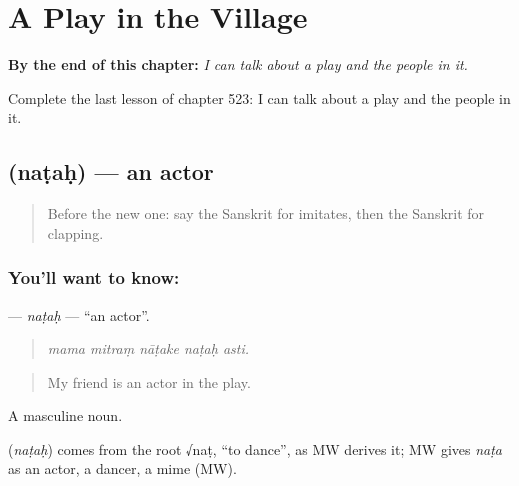 
\chapter{A Play in the Village}
\label{ch:sa-a-play-in-the-village}

\begin{chapteropening}
\textbf{By the end of this chapter:} \emph{I can talk about a play and the people in it.}

Complete the last lesson of chapter 523: I can talk about a play and the people in it.
\end{chapteropening}

\section[\texorpdfstring{\sk{नटः} (naṭaḥ)}{नटः (naṭaḥ)}]{ (naṭaḥ) — an actor}

\label{lesson:SA-C523-natah}



\begin{quote}
Before the new one: say the Sanskrit for imitates, then the Sanskrit for clapping.
\end{quote}

\subsection*{You'll want to know: }
\textbf{} — \emph{naṭaḥ} — \textquotedblleft{}an actor\textquotedblright{}.

\begin{quote}
    
\end{quote}

\begin{quote}
\emph{mama mitraṃ nāṭake naṭaḥ asti.}
\end{quote}

\begin{quote}
My friend is an actor in the play.
\end{quote}

A masculine noun.

\begin{cousinweb}
\textbf{} (\emph{naṭaḥ}) comes from the root √naṭ, \textquotedblleft{}to dance\textquotedblright{}, as MW derives it; MW gives \emph{naṭa} as an actor, a dancer, a mime (MW).
\end{cousinweb}


